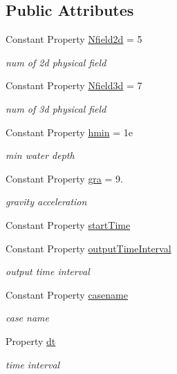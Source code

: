 \subsection*{Public Attributes}
\begin{DoxyCompactItemize}
\item 
Constant Property \hyperlink{class_l_s_w_e3d_af849f2fe32b1a884b69ba3254085b462}{Nfield2d} = 5
\begin{DoxyCompactList}\small\item\em num of 2d physical field \end{DoxyCompactList}\item 
Constant Property \hyperlink{class_l_s_w_e3d_a709fc952e6950aafc94868c19a7ae493}{Nfield3d} = 7
\begin{DoxyCompactList}\small\item\em num of 3d physical field \end{DoxyCompactList}\item 
Constant Property \hyperlink{class_l_s_w_e3d_a9cffdad6df1aca4b8056c75864a11873}{hmin} = 1e
\begin{DoxyCompactList}\small\item\em min water depth \end{DoxyCompactList}\item 
Constant Property \hyperlink{class_l_s_w_e3d_af1314e9786aeece58828b78d2518495f}{gra} = 9.
\begin{DoxyCompactList}\small\item\em gravity acceleration \end{DoxyCompactList}\item 
Constant Property \hyperlink{class_l_s_w_e3d_a44fbe9f87718a749072e1b78f1f81415}{start\+Time}
\item 
Constant Property \hyperlink{class_l_s_w_e3d_ac7fdd52c7fd26c4c17d559de23773be6}{output\+Time\+Interval}
\begin{DoxyCompactList}\small\item\em output time interval \end{DoxyCompactList}\item 
Constant Property \hyperlink{class_l_s_w_e3d_acc1fc0fb1e7c1aff37a202183b4081ae}{casename}
\begin{DoxyCompactList}\small\item\em case name \end{DoxyCompactList}\item 
Property \hyperlink{class_l_s_w_e3d_aa3cebe595d88d7e00087765b927335c6}{dt}
\begin{DoxyCompactList}\small\item\em time interval \end{DoxyCompactList}\end{DoxyCompactItemize}
